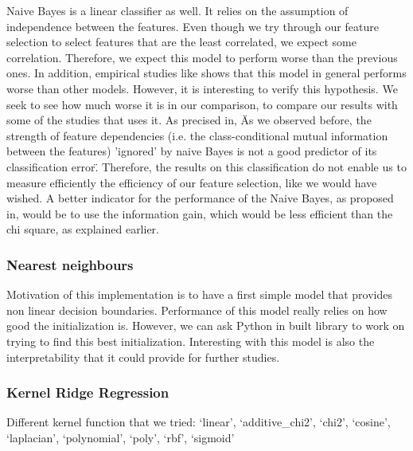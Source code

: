 \documentclass{article}
\begin{document}
    Naive Bayes is a linear classifier as well.
    It relies on the assumption of independence between the features.
    Even though we try through our feature selection to select features that are the least correlated, we expect some correlation.
    Therefore, we expect this model to perform worse than the previous ones.
    In addition, empirical studies like\cite{MLmodelsComparison} shows that this model in general performs worse than other models.
    However, it is interesting to verify this hypothesis.
    We seek to see how much worse it is in our comparison, to compare our results with some of the studies that uses it.
    As precised in\cite{NaiveBayesBackground}, \"As we observed before, the strength of feature dependencies (i.e. the class-conditional mutual information between the features) ’ignored’ by naive Bayes is not a good predictor of its classification error\".
    Therefore, the results on this classification do not enable us to measure efficiently the efficiency of our feature selection, like we would have wished.
    A better indicator for the performance of the Naive Bayes, as proposed in\cite{NaiveBayesBackground}, would be to use the information gain, which would be less efficient than the chi square, as explained earlier. %

    \subsubsection{Nearest neighbours}

    Motivation of this implementation is to have a first simple model that provides non linear decision boundaries.
    Performance of this model really relies on how good the initialization is.
    However, we can ask Python in built library to work on trying to find this best initialization.
    Interesting with this model is also the interpretability that it could provide for further studies.

    \subsubsection{Kernel Ridge Regression}

    Different kernel function that we tried:
    `linear', `additive\_chi2', `chi2', `cosine', `laplacian', `polynomial', `poly', `rbf', `sigmoid'
\end{document}

